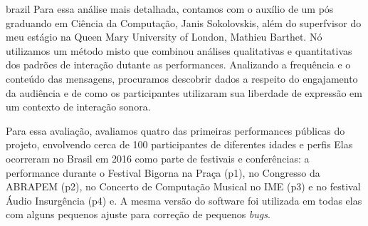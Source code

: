\begin{otherlanguage*}{brazil}
Para essa análise mais detalhada, contamos com o auxílio de um pós graduando em Ciência da Computação, Janis Sokolovskis, além do superfvisor do meu estágio na Queen Mary University of London, Mathieu Barthet. Nó utilizamos um método misto que combinou análises qualitativas e quantitativas dos padrões de interação dutante as performances. Analizando a frequência e o conteúdo das mensagens, procuramos descobrir dados a respeito do engajamento da audiência e de como os participantes utilizaram sua liberdade de expressão em um contexto de interação sonora. 


Para essa avaliação, avaliamos quatro das primeiras performances públicas do projeto, envolvendo cerca de 100 participantes de diferentes idades e perfis Elas ocorreram no Brasil em 2016 como parte de festivais e conferências: a performance durante o Festival Bigorna na Praça (p1), no Congresso da ABRAPEM (p2), no Concerto de Computação Musical no IME (p3) e no festival Áudio Insurgência (p4) e. A mesma versão do software foi utilizada em todas elas com alguns pequenos ajuste para correção de pequenos \emph{bugs}.








\end{otherlanguage*}
